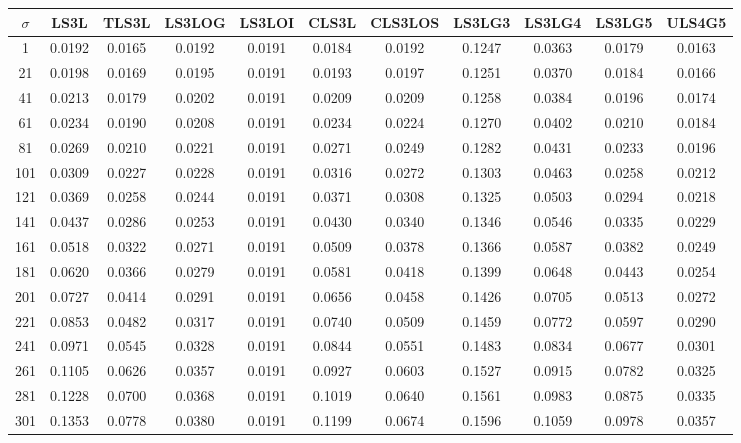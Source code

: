 \begin{table}[ht!]
\centering
\begin{tabular}{c|c|c|c|c|c|c|c|c|c|c}
$\sigma$ & \scriptsize{LS3L} & \scriptsize{TLS3L} & \scriptsize{LS3LOG} & \scriptsize{LS3LOI} & \scriptsize{CLS3L} & \scriptsize{CLS3LOS} & \scriptsize{LS3LG3} & \scriptsize{LS3LG4} & \scriptsize{LS3LG5} & \scriptsize{ULS4G5}\\ \hline 
1 & 0.0192 & 0.0165 & 0.0192 & 0.0191 & 0.0184 & 0.0192 & 0.1247 & 0.0363 & 0.0179 & 0.0163 \\ \hline
21 & 0.0198 & 0.0169 & 0.0195 & 0.0191 & 0.0193 & 0.0197 & 0.1251 & 0.0370 & 0.0184 & 0.0166 \\ \hline
41 & 0.0213 & 0.0179 & 0.0202 & 0.0191 & 0.0209 & 0.0209 & 0.1258 & 0.0384 & 0.0196 & 0.0174 \\ \hline
61 & 0.0234 & 0.0190 & 0.0208 & 0.0191 & 0.0234 & 0.0224 & 0.1270 & 0.0402 & 0.0210 & 0.0184 \\ \hline
81 & 0.0269 & 0.0210 & 0.0221 & 0.0191 & 0.0271 & 0.0249 & 0.1282 & 0.0431 & 0.0233 & 0.0196 \\ \hline
101 & 0.0309 & 0.0227 & 0.0228 & 0.0191 & 0.0316 & 0.0272 & 0.1303 & 0.0463 & 0.0258 & 0.0212 \\ \hline
121 & 0.0369 & 0.0258 & 0.0244 & 0.0191 & 0.0371 & 0.0308 & 0.1325 & 0.0503 & 0.0294 & 0.0218 \\ \hline
141 & 0.0437 & 0.0286 & 0.0253 & 0.0191 & 0.0430 & 0.0340 & 0.1346 & 0.0546 & 0.0335 & 0.0229 \\ \hline
161 & 0.0518 & 0.0322 & 0.0271 & 0.0191 & 0.0509 & 0.0378 & 0.1366 & 0.0587 & 0.0382 & 0.0249 \\ \hline
181 & 0.0620 & 0.0366 & 0.0279 & 0.0191 & 0.0581 & 0.0418 & 0.1399 & 0.0648 & 0.0443 & 0.0254 \\ \hline
201 & 0.0727 & 0.0414 & 0.0291 & 0.0191 & 0.0656 & 0.0458 & 0.1426 & 0.0705 & 0.0513 & 0.0272 \\ \hline
221 & 0.0853 & 0.0482 & 0.0317 & 0.0191 & 0.0740 & 0.0509 & 0.1459 & 0.0772 & 0.0597 & 0.0290 \\ \hline
241 & 0.0971 & 0.0545 & 0.0328 & 0.0191 & 0.0844 & 0.0551 & 0.1483 & 0.0834 & 0.0677 & 0.0301 \\ \hline
261 & 0.1105 & 0.0626 & 0.0357 & 0.0191 & 0.0927 & 0.0603 & 0.1527 & 0.0915 & 0.0782 & 0.0325 \\ \hline
281 & 0.1228 & 0.0700 & 0.0368 & 0.0191 & 0.1019 & 0.0640 & 0.1561 & 0.0983 & 0.0875 & 0.0335 \\ \hline
301 & 0.1353 & 0.0778 & 0.0380 & 0.0191 & 0.1199 & 0.0674 & 0.1596 & 0.1059 & 0.0978 & 0.0357 \\ \hline

\end{tabular}
\end{table}
